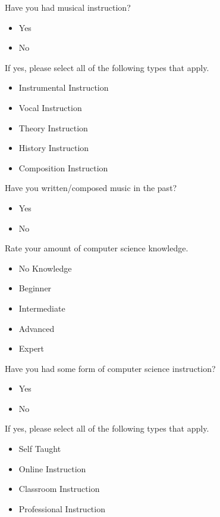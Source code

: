 \noindent Have you had musical instruction?

\begin{itemize}
	\item Yes
	\item No
\end{itemize}

\noindent If yes, please select all of the following types that apply.

\begin{itemize}
	\item Instrumental Instruction
	\item Vocal Instruction
	\item Theory Instruction
	\item History Instruction
	\item Composition Instruction
\end{itemize}

\noindent Have you written/composed music in the past?

\begin{itemize}
	\item Yes
	\item No
\end{itemize}

\noindent Rate your amount of computer science knowledge.

\begin{itemize}
	\item No Knowledge
	\item Beginner
	\item Intermediate
	\item Advanced
	\item Expert
\end{itemize}

\noindent Have you had some form of computer science instruction?

\begin{itemize}
	\item Yes
	\item No
\end{itemize}

\noindent If yes, please select all of the following types that apply.

\begin{itemize}
	\item Self Taught
	\item Online Instruction
	\item Classroom Instruction
	\item Professional Instruction
\end{itemize}

